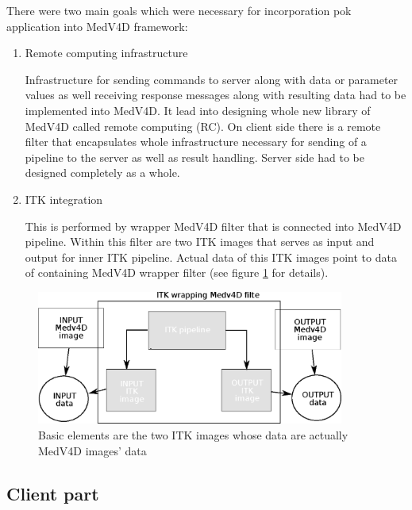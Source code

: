 \par
There were two main goals which were necessary for incorporation pok application into MedV4D framework:
\begin{enumerate}

  \item{Remote computing infrastructure}
  \par
  Infrastructure for sending commands to server along with data or parameter values as well receiving response messages along with resulting data had to be implemented into MedV4D.
It lead into designing whole new library of MedV4D called remote computing (RC).
On client side there is a remote filter that encapsulates whole infrastructure necessary for sending of a pipeline to the server as well as result handling.
Server side had to be designed completely as a whole.

  \item{ITK integration}
  \par
  This is performed by wrapper MedV4D filter that is connected into MedV4D pipeline.
Within this filter are two ITK images that serves as input and output for inner ITK pipeline.
Actual data of this ITK images point to data of containing MedV4D wrapper filter (see figure \ref{fg:ITKWrapping} for details).

\end{enumerate}

\begin{figure}
    \centering
    \includegraphics[width=0.9\textwidth]{data/ITKFilter}
    \caption[ITK wrapper MedV4D filter]{Basic elements are the two ITK images whose data are actually MedV4D images' data}
    \label{fg:ITKWrapping}
\end{figure}

\subsection{Client part}

